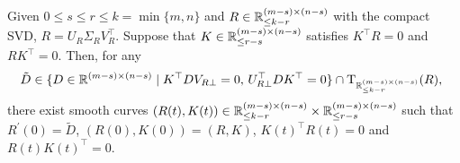 \begin{lemma}\label{lem:constrained_boundedrank_curve}
    Given $0\le s\le r\le k=\min\{m,n\}$ and $R\in\mathbb{R}^{(m-s)\times (n-s)}_{\le k-r}$ with the compact SVD, $R=U_R\varSigma_RV_R^\top$. Suppose that $K\in\mathbb{R}^{(m-s)\times (n-s)}_{\le r-s}$ satisfies $K^\top R=0$ and $RK^\top=0$.  Then, for any 
    \begin{equation}\label{eq:nanifold}
    \!\!\tilde{D}\in\{D\in\mathbb{R}^{(m-s)\times (n-s)}\mid K^\top D V_{R\bot}=0,\,U_{R\bot}^\top D K^\top=0\}\cap\mathrm{T}_{\mathbb{R}^{(m-s)\times(n-s)}_{\le k-r}}(R),
    \end{equation}
    there exist smooth curves $(R(t),K(t))\in\mathbb{R}^{(m-s)\times(n-s)}_{\le k-r}\times \mathbb{R}^{(m-s)\times(n-s)}_{\le r-s}$ such that $R^\prime(0)=\tilde{D}$, $(R(0),K(0))=(R,K)$, $K(t)^\top R(t)=0$ and $R(t)K(t)^\top=0$.
\end{lemma}
